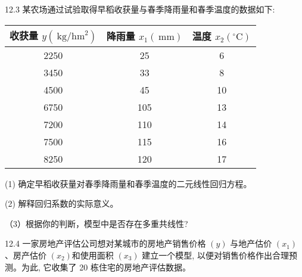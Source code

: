 \documentclass[10pt]{article}
\begin{document}
\begin{CJK*}{UTF8}{bsmi}
12.3 某农场通过试验取得早稻收获量与春季降雨量和春季温度的数据如下:

\begin{center}
\begin{tabular}{ccc}
\hline
收获量 $y\left(\mathrm{~kg} / \mathrm{hm}^{2}\right)$ & 降雨量 $x_{1}(\mathrm{~mm})$ & 温度 $x_{2}\left({ }^{\circ} \mathrm{C}\right)$ \\
\hline
2250 & 25 & 6 \\
3450 & 33 & 8 \\
4500 & 45 & 10 \\
6750 & 105 & 13 \\
7200 & 110 & 14 \\
7500 & 115 & 16 \\
8250 & 120 & 17 \\
\hline
\end{tabular}
\end{center}

(1) 确定早稻收获量对春季降雨量和春季温度的二元线性回归方程。

(2) 解释回归系数的实际意义。

（3）根据你的判断，模型中是否存在多重共线性?

12.4 一家房地产评估公司想对某城市的房地产销售价格 $(y)$ 与地产估价 $\left(x_{1}\right)$ 、房产估价 $\left(x_{2}\right)$和使用面积 $\left(x_{3}\right)$ 建立一个模型, 以便对销售价格作出合理预测。为此, 它收集了 20 栋住宅的房地产评估数据。


\end{CJK*}
\end{document}
